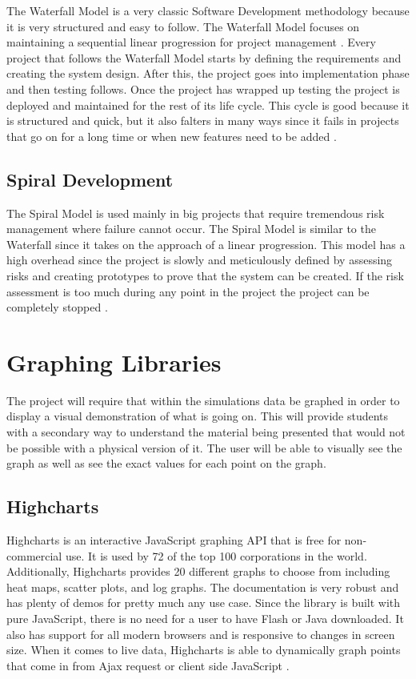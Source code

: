 \documentclass[capstone.tex]{subfiles}
\begin{document}
The Waterfall Model is a very classic Software Development methodology because it is very structured and easy to follow. The Waterfall Model focuses on maintaining a sequential linear progression for project management \cite{Lucid_Waterfall}. Every project that follows the Waterfall Model starts by defining the requirements and creating the system design. After this, the project goes into implementation phase and then testing follows. Once the project has wrapped up testing the project is deployed and maintained for the rest of its life cycle. This cycle is good because it is structured and quick, but it also falters in many ways since it fails in projects that go on for a long time or when new features need to be added \cite{Software_Development}.

\subsection{Spiral Development}

The Spiral Model is used mainly in big projects that require tremendous risk management where failure cannot occur. The Spiral Model is similar to the Waterfall since it takes on the approach of a linear progression. This model has a high overhead since the project is slowly and meticulously defined by assessing risks and creating prototypes to prove that the system can be created. If the risk assessment is too much during any point in the project the project can be completely stopped \cite{Spiral}.

\section{Graphing Libraries}

The project will require that within the simulations data be graphed in order to display a visual demonstration of what is going on. This will provide students with a secondary way to understand the material being presented that would not be possible with a physical version of it. The user will be able to visually see the graph as well as see the exact values for each point on the graph.

\subsection{Highcharts}

Highcharts is an interactive JavaScript graphing API that is free for non-commercial use. It is used by 72 of the top 100 corporations in the world. Additionally, Highcharts provides 20 different graphs to choose from including heat maps, scatter plots, and log graphs. The documentation is very robust and has plenty of demos for pretty much any use case. Since the library is built with pure JavaScript, there is no need for a user to have Flash or Java downloaded. It also has support for all modern browsers and is responsive to changes in screen size. When it comes to live data, Highcharts is able to dynamically graph points that come in from Ajax request or client side JavaScript \cite{Highcharts}. 
\end{document}
